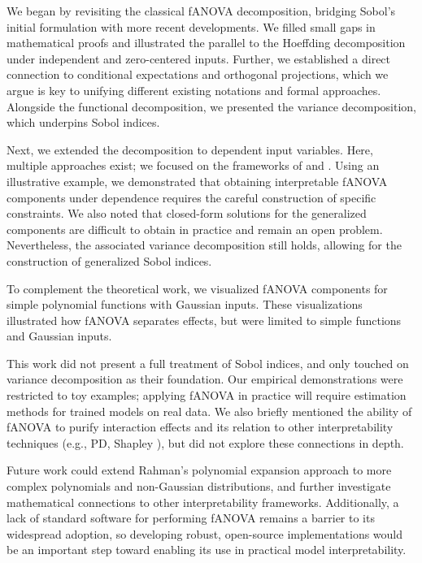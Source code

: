 We began by revisiting the classical fANOVA decomposition, bridging Sobol's initial formulation with more recent developments. We filled small gaps in mathematical proofs and illustrated the parallel to the Hoeffding decomposition under independent and zero-centered inputs. Further, we established a direct connection to conditional expectations and orthogonal projections, which we argue is key to unifying different existing notations and formal approaches. Alongside the functional decomposition, we presented the variance decomposition, which underpins Sobol indices.\par

Next, we extended the decomposition to dependent input variables. Here, multiple approaches exist; we focused on the frameworks of \cite{hooker2007} and \cite{rahman2014}.
Using an illustrative example, we demonstrated that obtaining interpretable fANOVA components under dependence requires the careful construction of specific constraints. We also noted that closed-form solutions for the generalized components are difficult to obtain in practice and remain an open problem. Nevertheless, the associated variance decomposition still holds, allowing for the construction of generalized Sobol indices.\par

To complement the theoretical work, we visualized fANOVA components for simple polynomial functions with Gaussian inputs. These visualizations illustrated how fANOVA separates effects, but were limited to simple functions and Gaussian inputs.\par

This work did not present a full treatment of Sobol indices, and only touched on variance decomposition as their foundation. Our empirical demonstrations were restricted to toy examples; applying fANOVA in practice will require estimation methods for trained models on real data. We also briefly mentioned the ability of fANOVA to purify interaction effects \citep{lengerich2020} and its relation to other interpretability techniques (e.g., PD, Shapley \citep{fumagalli2025}), but did not explore these connections in depth.\par

Future work could extend Rahman’s polynomial expansion approach to more complex polynomials and non-Gaussian distributions, and further investigate mathematical connections to other interpretability frameworks.
Additionally, a lack of standard software for performing fANOVA remains a barrier to its widespread adoption, so developing robust, open-source implementations would be an important step toward enabling its use in practical model interpretability.

